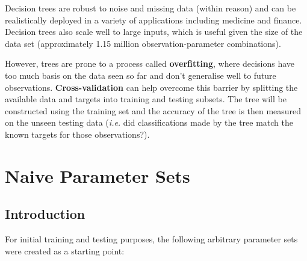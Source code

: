 Decision trees are robust to noise and missing data (within reason) and can be
realistically deployed in a variety of applications including medicine and
finance. Decision trees also scale well to large inputs, which is useful given
the size of the data set (approximately 1.15 million observation-parameter
combinations).

However, trees are prone to a process called \textbf{overfitting}, where
decisions have too much basis on the data seen so far and don't generalise well
to future observations. \textbf{Cross-validation} can help overcome this barrier
by splitting the available data and targets into training and testing subsets.
The tree will be constructed using the training set and the accuracy of the tree
is then measured on the unseen testing data (\textit{i.e.} did classifications
made by the tree match the known targets for those observations?).


\section{Naive Parameter Sets}
\subsection{Introduction}

For initial training and testing purposes, the following arbitrary parameter
sets were created as a starting point:

